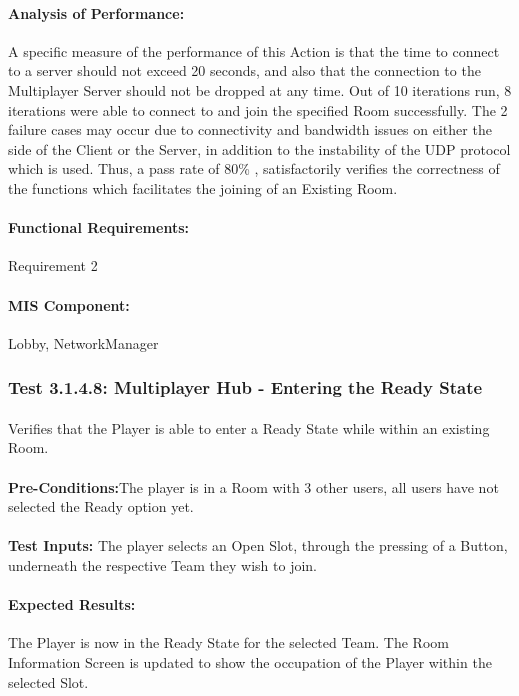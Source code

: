 \documentclass{article}
\begin{document}
    \paragraph{Analysis of Performance:} A specific measure of the performance of this Action is that the time to connect to a server should not exceed 20 seconds, and also that the connection to the Multiplayer Server should not be dropped at any time. Out of 10 iterations run, 8 iterations were able to connect to and join the specified Room successfully. The 2 failure cases may occur due to connectivity and bandwidth issues on either the side of the Client or the Server, in addition to the instability of the UDP protocol which is used.  Thus, a pass rate of 80\% , satisfactorily verifies the correctness of the functions which facilitates the joining of an Existing Room.  
     \paragraph{Functional Requirements:} Requirement 2
    \paragraph{MIS Component:} Lobby, NetworkManager
    
    \subsubsection{Test 3.1.4.8: Multiplayer Hub - Entering the Ready State}
    \paragraph{} Verifies that the Player is able to enter a Ready State while within an existing Room.
    \paragraph{}\textbf{Pre-Conditions:}The player is in a Room with 3 other users, all users have not selected the Ready option yet.
    \paragraph{}\textbf{Test Inputs:} The player selects an Open Slot, through the pressing of a Button, underneath the respective Team they wish to join.
    \paragraph{Expected Results:} The Player is now in the Ready State for the selected Team. The Room Information Screen is updated to show the occupation of the Player within the selected Slot.
\end{document}
